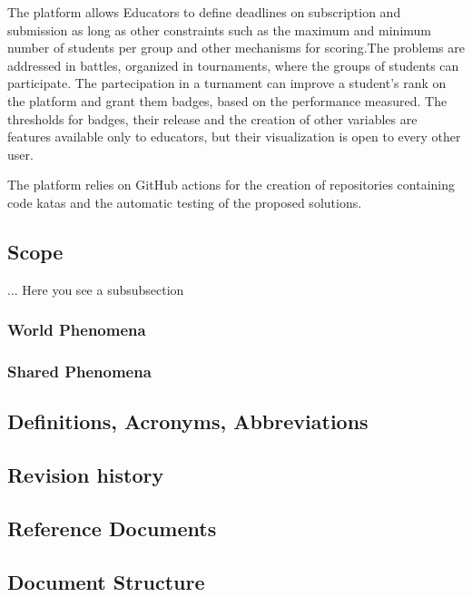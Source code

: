 The platform allows Educators to define deadlines on subscription and submission as long as other constraints such as the maximum and minimum number of students per group and other mechanisms for scoring.The problems are addressed in battles, organized in tournaments, where the groups of students can participate. 
The partecipation in a turnament can improve a student's rank on the platform and grant them badges, based on the performance measured.
The thresholds for badges, their release and the creation of other variables are features available only to educators, but their visualization is open to every other user.

The platform relies on GitHub actions for the creation of repositories containing code katas and the automatic testing of the proposed solutions.

\subsection{Scope}
... Here you see a subsubsection

\subsubsection{World Phenomena}

\subsubsection{Shared Phenomena}

\subsection{Definitions, Acronyms, Abbreviations}

\subsection{Revision history}

\subsection{Reference Documents}

\subsection{Document Structure}
